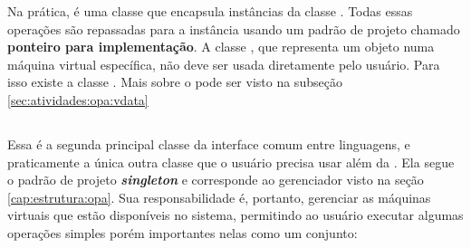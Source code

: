   
  Na prática, \VObj{} é uma classe que encapsula instâncias da classe \VData{}. Todas essas
  operações são repassadas para a instância \VData{} usando um padrão de projeto chamado
  \textbf{ponteiro para implementação}\footnotemark{}. A classe \VData{}, que representa um objeto numa máquina
  virtual específica, não deve ser usada diretamente pelo usuário. Para isso existe a classe
  \VObj{}. Mais sobre o \VData{} pode ser visto na subseção \ref{sec:atividades:opa:vdata}
  
  
  \subsection{\SMgr{}}
  \label{sec:atividades:opa:smgr}
  Essa é a segunda principal classe da interface comum entre linguagens, e praticamente a
  única outra classe que o usuário precisa usar além da \VObj{}. Ela segue o padrão de projeto
  \textbf{\textit{singleton}}\footnotemark{} e corresponde ao gerenciador visto na seção
  \ref{cap:estrutura:opa}. Sua responsabilidade é, portanto, gerenciar as máquinas virtuais
  que estão disponíveis no sistema, permitindo ao usuário executar algumas operações simples
  porém importantes nelas como um conjunto:

  
